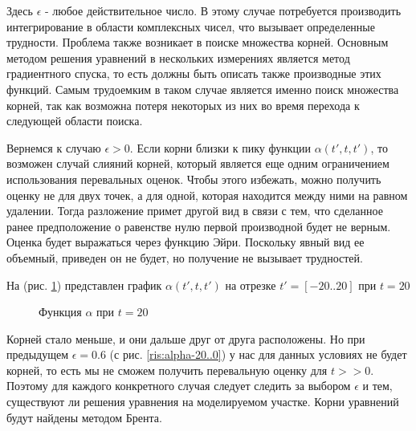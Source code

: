 \documentclass[%
bachelor,    %
natbib,      %
subf,        %
href,        %
colorlinks,  %
]{disser}
\newcommand{\sectionbreak}{\clearpage}
\begin{document}
Здесь $\epsilon$ - любое действительное число. В этому случае потребуется производить интегрирование в области комплексных чисел, что вызывает определенные трудности. Проблема также возникает в поиске множества корней. Основным методом решения уравнений в нескольких измерениях является метод градиентного спуска, то есть должны быть описать также производные этих функций. Самым трудоемким в таком случае является именно поиск множества корней, так как возможна потеря некоторых из них во время перехода к следующей области поиска.

Вернемся к случаю $\epsilon > 0$. Если корни близки к пику функции $\alpha(t', t, t')$, то возможен случай слияний корней, который является еще одним ограничением использования перевальных оценок.
Чтобы этого избежать, можно получить оценку не для двух точек, а для одной, которая находится между ними на равном удалении.
Тогда разложение примет другой вид в связи с тем, что сделанное ранее предположение о равенстве нулю первой производной будет не верным. Оценка будет выражаться через функцию Эйри.\cite{spec} Поскольку явный вид ее объемный, приведен он не будет, но получение не вызывает трудностей.

На (рис. \ref{ris:alpha-20..20}) представлен график $\alpha(t', t, t')$ на отрезке $t' = [-20..20]$ при $t = 20$ 

\begin{figure}[h]
	\caption{Функция $\alpha$ при $t = 20$}
	\label{ris:alpha-20..20}
\end{figure}

Корней стало меньше, и они дальше друг от друга расположены. Но при предыдущем $\epsilon = 0.6$ (с рис. \ref{ris:alpha-20..0}) у нас для данных условиях не будет корней, то есть мы не сможем получить перевальную оценку для $t>>0$.
Поэтому для каждого конкретного случая следует следить за выбором $\epsilon$ и тем, существуют ли решения уравнения на моделируемом участке.
Корни уравнений будут найдены методом Брента. \cite{tarasevych}
\sectionbreak
\end{document}
